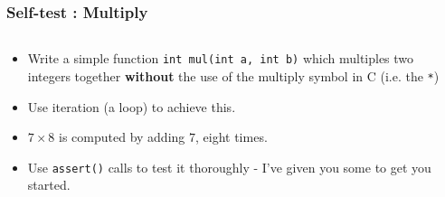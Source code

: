 
\begin{frame}[fragile]
\frametitle{Self-test : Multiply}
\begin{columns}

\begin{column}{0.5\textwidth}
\begin{itemize}[<+->]
\item Write a simple function \verb^int mul(int a, int b)^ which
multiples two integers together {\bf without} the use of the
multiply symbol in C (i.e. the \verb^*^)
\item Use iteration (a loop) to achieve this.
\item $7\times8$ is computed by adding $7$, eight times.
\item Use \verb^assert()^ calls to test it thoroughly - I've given you some to get you started.
\end{itemize}
\end{column}

\begin{column}{0.40\textwidth}

\end{column}

\end{columns}
\end{frame}


